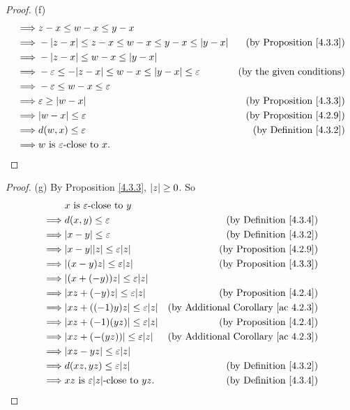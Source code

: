 \begin{proof}{(f)}
\begin{align*}
\implies & z - x \leq w - x \leq y - x \\
\implies & -\abs*{z - x} \leq z - x \leq w - x \leq y - x \leq \abs*{y - x} & \text{(by Proposition \ref{4.3.3})} \\
\implies & -\abs*{z - x} \leq w - x \leq \abs*{y - x} \\
\implies & -\varepsilon \leq -\abs*{z - x} \leq w - x \leq \abs*{y - x} \leq \varepsilon & \text{(by the given conditions)} \\
\implies & -\varepsilon \leq w - x \leq \varepsilon \\
\implies & \varepsilon \geq \abs*{w - x} & \text{(by Proposition \ref{4.3.3})} \\
\implies & \abs*{w - x} \leq \varepsilon & \text{(by Proposition \ref{4.2.9})} \\
\implies & d(w, x) \leq \varepsilon & \text{(by Definition \ref{4.3.2})} \\
\implies & w \text{ is } \varepsilon\text{-close to } x.
\end{align*}
\end{proof}

\begin{proof}{(g)}
By Proposition \ref{4.3.3}, \(\abs*{z} \geq 0\).
So
\begin{align*}
& x \text{ is } \varepsilon\text{-close to } y \\
\implies & d(x, y) \leq \varepsilon & \text{(by Definition \ref{4.3.4})} \\
\implies & \abs*{x - y} \leq \varepsilon & \text{(by Definition \ref{4.3.2})} \\
\implies & \abs*{x - y}\abs*{z} \leq \varepsilon\abs*{z} & \text{(by Proposition \ref{4.2.9})} \\
\implies & \abs*{(x - y)z} \leq \varepsilon\abs*{z} & \text{(by Proposition \ref{4.3.3})} \\
\implies & \abs*{(x + (-y))z} \leq \varepsilon\abs*{z} \\
\implies & \abs*{xz + (-y)z} \leq \varepsilon\abs*{z} & \text{(by Proposition \ref{4.2.4})} \\
\implies & \abs*{xz + ((-1)y)z} \leq \varepsilon\abs*{z} & \text{(by Additional Corollary \ref{ac 4.2.3})} \\
\implies & \abs*{xz + (-1)(yz)} \leq \varepsilon\abs*{z} & \text{(by Proposition \ref{4.2.4})} \\
\implies & \abs*{xz + (-(yz))} \leq \varepsilon\abs*{z} & \text{(by Additional Corollary \ref{ac 4.2.3})} \\
\implies & \abs*{xz - yz} \leq \varepsilon\abs*{z} \\
\implies & d(xz, yz) \leq \varepsilon\abs*{z} & \text{(by Definition \ref{4.3.2})} \\
\implies & xz \text{ is } \varepsilon\abs*{z}\text{-close to } yz. & \text{(by Definition \ref{4.3.4})} \\
\end{align*}
\end{proof}


